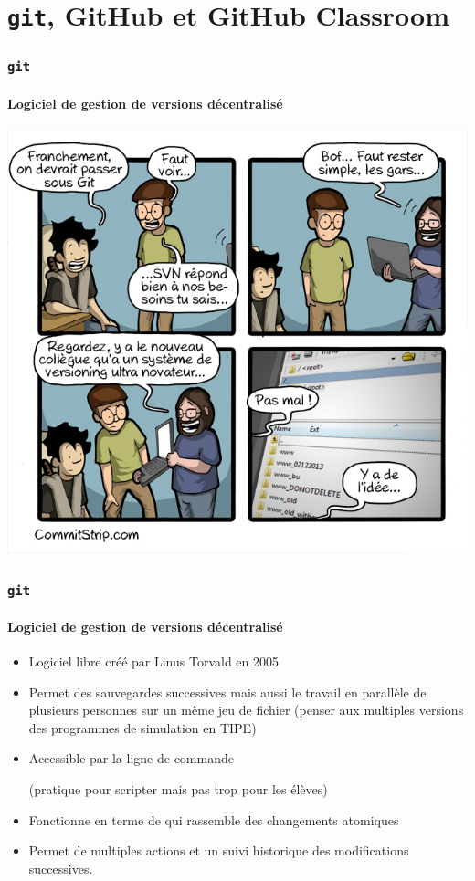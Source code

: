 \section{\texttt{git}, GitHub et GitHub Classroom}

\begin{frame}
\frametitle{\texttt{git}}
\framesubtitle{Logiciel de gestion de versions décentralisé}

\begin{center}
	\includegraphics[height=0.8\textheight]{figures/Strips-_Old-650-final1.jpg}
\end{center}

\end{frame}

\begin{frame}
\frametitle{\texttt{git}}
\framesubtitle{Logiciel de gestion de versions décentralisé}

\begin{itemize}[<+->]
	\item	 Logiciel libre créé par Linus Torvald en 2005
	\item  Permet des sauvegardes successives mais aussi le travail en parallèle de plusieurs personnes sur un même jeu de fichier (penser aux multiples versions des programmes de simulation en TIPE)
	\item  Accessible par la ligne de commande

	(pratique pour scripter mais pas trop pour les élèves)
	\item  Fonctionne en terme de  qui rassemble des changements atomiques
	\item 	Permet de multiples actions et un suivi historique des modifications successives.

\end{itemize}

\end{frame}


